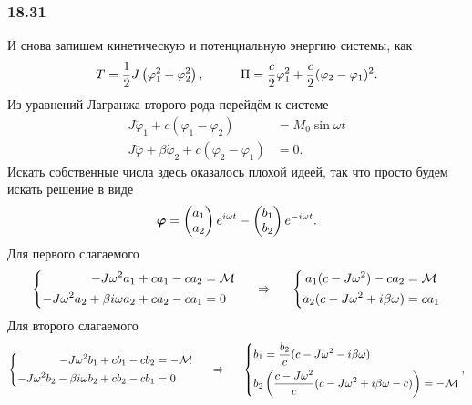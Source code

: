 \subsubsection*{18.31}


И снова запишем кинетическую и потенциальную энергию системы, как
\begin{equation*}
    T = \frac{1}{2} J \left(\varphi_1^2 + \varphi_2^2\right),
    \hspace{1 cm}
    \Pi = \frac{c}{2} \varphi_1^2 + \frac{c}{2}(\varphi_2 - \varphi_1)^2.
\end{equation*}
Из уравнений Лагранжа второго рода перейдём к системе
\begin{align*}
    J \ddot{\varphi}_1 + c(\varphi_1 - \varphi_2) &= M_0 \sin \omega t\\
    J \ddot{\varphi} + \beta \dot{\varphi}_2 + c (\varphi_2 - \varphi_1) &= 0.
\end{align*}
Искать собственные числа здесь оказалось плохой идеей, так что просто будем искать решение в виде
\begin{equation*}
    \mbox{\boldmath $\varphi$} = \begin{pmatrix}
        a_1 \\ a_2
    \end{pmatrix} e^{i\omega t} - 
    \begin{pmatrix}
        b_1 \\ b_2
    \end{pmatrix} e^{-i\omega t}.
\end{equation*}
Для первого слагаемого
\begin{equation*}
    \left\{\begin{aligned}
        - J \omega^2 a_1 + c a_1 - c a_2 &= \mathcal M \\
        - J \omega^2 a_2 + \beta i \omega a_2 + c a_2 - c a_1 &= 0
    \end{aligned}\right.
    \hspace{0.5cm} \Rightarrow \hspace{0.5cm}
    \left\{\begin{aligned}
        a_1 (c - J \omega^2) - c a_2 &= \mathcal M \\
        a_2 (c - J \omega^2 + i \beta \omega) &= c a_1
    \end{aligned}\right.
\end{equation*}
Для второго слагаемого
\begin{equation*}
    \left\{\begin{aligned}
        - J \omega^2 b_1 + c b_1 - c b_2 &= - \mathcal M \\
        - J \omega^2 b_2 - \beta i \omega b_2 + c b_2 - c b_1 &= 0
    \end{aligned}\right.
    \hspace{0.5cm} \Rightarrow \hspace{0.5cm}
    \left\{\begin{aligned}
        &b_1 = \frac{b_2}{c} (c - J \omega^2 - i \beta \omega) \\
        &b_2 \left(\frac{c - J \omega^2}{c} (c - J \omega^2 + i \beta \omega - c)\right) = - \mathcal M
    \end{aligned}\right.
    ,
\end{equation*}
